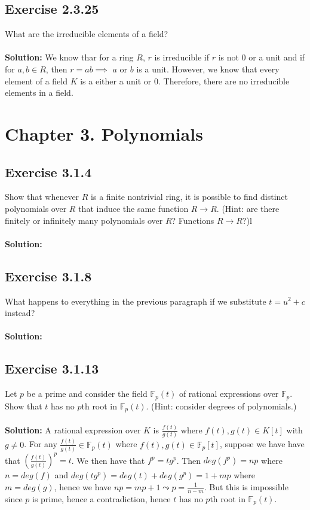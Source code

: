 \documentclass{article}
\begin{document}
\subsection*{Exercise 2.3.25}
What are the irreducible elements of a field?
\\\\
\textbf{Solution:}
We know thar for a ring $R$, $r$ is irreducible if $r$ is not 0 or a unit and if for $a,b \in R$, 
then $r = ab \implies$ $a$ or $b$ is a unit.
However, we know that every element of a field $K$ is a either a unit or 0. Therefore, there are no
irreducible elements in a field.

\section*{Chapter 3. Polynomials}

\subsection*{Exercise 3.1.4}
Show that whenever $R$ is a finite nontrivial ring, it is
possible to find distinct polynomials over $R$ that induce the same function
$R \rightarrow R$. (Hint: are there finitely or infinitely many polynomials
over $R$? Functions $R \rightarrow R$?)l
\\\\
\textbf{Solution:}

\subsection*{Exercise 3.1.8}
What happens to everything in the previous paragraph
if we substitute $t=u^2+c$ instead?
\\\\
\textbf{Solution:}

\subsection*{Exercise 3.1.13}
Let $p$ be a prime and consider the field $\mathbb{F}_p(t)$ of
rational expressions over $\mathbb{F}_p$. Show that $t$ has no $p$th root in $\mathbb{F}_p(t)$.
(Hint: consider degrees of polynomials.)
\\\\
\textbf{Solution:}
A rational expression over $K$ is $\frac{f(t)}{g(t)}$ where $f(t), g(t) \in K[t]$ with $g \neq 0$.
For any $\frac{f(t)}{g(t)} \in \mathbb{F}_p(t)$ where $f(t), g(t) \in \mathbb{F}_p[t]$, suppose we have
have that $\left( \frac{f(t)}{g(t)} \right)^p = t$. We then have that $f^p = tg^p$. Then $deg(f^p) = np$ where $n=deg(f)$ and
$deg(tg^p) = deg(t)+deg(g^p) = 1 + mp$ where $m=deg(g)$, hence we have $np = mp+1 \leadsto p = \frac{1}{n-m}$.
But this is impossible since $p$ is prime, hence a contradiction, hence $t$ has no $p$th root in $\mathbb{F}_p(t)$.
\end{document}
